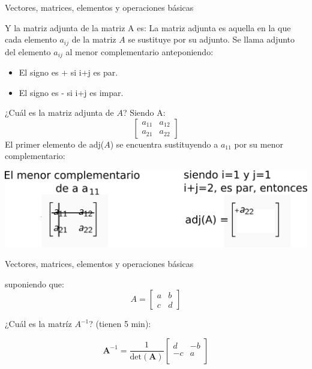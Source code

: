 \documentclass[aspectratio=169]{beamer}
\begin{document}
\begin{frame}
 {Vectores, matrices, elementos y operaciones b\'asicas}
 
\vskip -0.2cm
{\color{black}
Y la matriz adjunta de la matriz A es:
\vskip -0.2cm
La matriz adjunta es aquella en la que cada elemento $a_{ij}$ de la matriz $A$ se sustituye por su adjunto. Se llama adjunto del elemento $a_{ij}$ al menor complementario anteponiendo:
\vskip -0.2cm
\begin{itemize}
 \item {\color{black} El signo es + si i+j es par.}
 \item {\color{black} El signo es - si i+j es impar.}
\end{itemize} 
\vskip -0.2cm
¿Cuál es la matriz adjunta de $A$? Siendo A:
\vskip -0.4cm
\begin{equation*}
 \begin{bmatrix}
  a_{11} & a_{12} \\
  a_{21} & a_{22}
 \end{bmatrix}
\end{equation*}
\pause
\vskip -0.4cm
El primer elemento de adj($A$) se encuentra sustituyendo a $a_{11}$ por su menor complementario:

\begin{center}
\vskip -0.6cm \includegraphics[width=0.6\linewidth]{images/adjunta.png} 
\end{center}
}

\end{frame}



\begin{frame}
 {Vectores, matrices, elementos y operaciones b\'asicas}
 
 {\color{black}
  suponiendo que:
 \vskip -0.5cm
 \begin{equation*}
  A = \begin{bmatrix}
       a & b \\
       c & d
      \end{bmatrix}
 \end{equation*}

¿Cuál es la matríz $A^{-1}$? (tienen 5 min):

\pause
\pause
\begin{equation*}
 \mathbf{A}^{-1} = \frac{1}{\text{det}(\mathbf{A})} \begin{bmatrix}
d & -b \\
-c & a \\
\end{bmatrix}
\end{equation*}
}
 
\end{frame}
\end{document}
